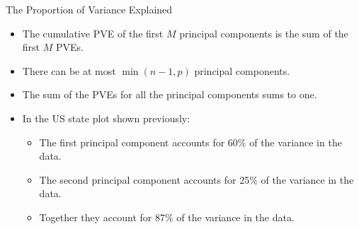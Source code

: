 \documentclass[
  ignorenonframetext,
  aspectratio=169,
]{beamer}
\begin{document}
\begin{frame}{The Proportion of Variance Explained}
\protect\hypertarget{the-proportion-of-variance-explained-1}{}
\begin{itemize}
\item
  The cumulative PVE of the first \(M\) principal components is the sum
  of the first \(M\) PVEs.
\item
  There can be at most \(\min(n-1, p)\) principal components.
\item
  The sum of the PVEs for all the principal components sums to one.
\item
  In the US state plot shown previously:

  \begin{itemize}
  \item
    The first principal component accounts for 60\% of the variance in
    the data.
  \item
    The second principal component accounts for 25\% of the variance in
    the data.
  \item
    Together they account for 87\% of the variance in the data.
  \end{itemize}
\end{itemize}
\end{frame}
\end{document}

